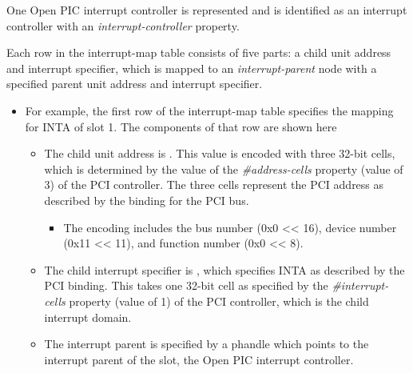\documentclass[a4paper,10pt,oneside]{sphinxmanual}
\begin{document}
One Open PIC interrupt controller is represented and is identified as an
interrupt controller with an \emph{interrupt-controller} property.

Each row in the interrupt-map table consists of five parts: a child unit
address and interrupt specifier, which is mapped to an \emph{interrupt-parent}
node with a specified parent unit address and interrupt specifier.
\begin{itemize}
\item {} 
For example, the first row of the interrupt-map table specifies the
mapping for INTA of slot 1. The components of that row are shown here

\begin{itemize}
\item {} 
The child unit address is . This value is encoded
with three 32-bit cells, which is determined by the value of the
\emph{\#address-cells} property (value of 3) of the PCI controller. The
three cells represent the PCI address as described by the binding for
the PCI bus.
\begin{itemize}
\item {} 
The encoding includes the bus number (0x0 \textless{}\textless{} 16), device number
(0x11 \textless{}\textless{} 11), and function number (0x0 \textless{}\textless{} 8).

\end{itemize}

\item {} 
The child interrupt specifier is \code{\textless{}1\textgreater{}}, which specifies INTA as
described by the PCI binding. This takes one 32-bit cell as specified
by the \emph{\#interrupt-cells} property (value of 1) of the PCI
controller, which is the child interrupt domain.

\item {} 
The interrupt parent is specified by a phandle which points to the
interrupt parent of the slot, the Open PIC interrupt controller.


\end{itemize}
\end{itemize}
\end{document}
